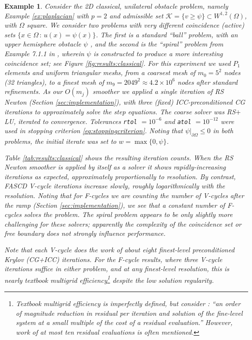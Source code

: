 \documentclass[letterpaper,final,12pt,reqno]{amsart}
\theoremstyle{cstyle}
\theoremstyle{cstyle*}
\theoremstyle{dstyle}
\newtheorem{example}[theorem]{Example}
\numberwithin{equation}{section}
\numberwithin{figure}{section}
\numberwithin{table}{section}
\numberwithin{theorem}{section}
\begin{document}
\begin{example} \label{ex:results:classical}
Consider the 2D classical, unilateral obstacle problem, namely Example \ref{ex:plaplacian} with $p=2$ and admissible set $\mathcal{K} = \{v \ge \psi\} \subset W^{1,2}(\Omega)$, with $\Omega$ square.  We consider two problems with very different coincidence (active) sets $\{x\in\Omega \,:\, u(x)=\psi(x)\}$.   The first is a standard ``ball'' problem, with an upper hemisphere obstacle $\psi$ \cite[Chapter 12]{Bueler2021}, and the second is the ``spiral'' problem from Example 7.1.1 in \cite{GraeserKornhuber2009}, wherein $\psi$ is constructed to produce a more interesting coincidence set; see Figure \ref{fig:results:classical}.  For this experiment we used $P_1$ elements and uniform triangular meshs, from a coarsest mesh of $m_0=5^2$ nodes (32 triangles), to a finest mesh of $m_9=2049^2 \approx 4.2 \times 10^{6}$ nodes after standard refinements.  As our $O(m_j)$ smoother we applied a single iteration of RS Newton (Section \ref{sec:implementation}), with three (fixed) ICC-preconditioned CG iterations to approximately solve the step equations.  The coarse solver was RS$+$LU, iterated to convergence.  Tolerances \texttt{rtol} $= 10^{-6}$ and \texttt{atol} $= 10^{-12}$ were used in stopping criterion \eqref{eq:stoppingcriterion}.  Noting that $\psi\big|_{\partial \Omega} \le 0$ in both problems, the initial iterate was set to $w=\max\{0,\psi\}$.

Table \ref{tab:results:classical} shows the resulting iteration counts.  When the RS Newton smoother is applied by itself as a solver it shows rapidly-increasing iterations as expected, approximately proportionally to resolution.  By contrast, FASCD V-cycle iterations increase slowly, roughly logarithmically with the resolution.  Noting that for F-cycles we are counting the number of V-cycles after the ramp (Section \ref{sec:implementation}), we see that a constant number of F-cycles solves the problem.  The spiral problem appears to be only slightly more challenging for these solvers; apparently the complexity of the coincidence set or free boundary does not strongly influence performance.

Note that each V-cycle does the work of about eight finest-level preconditioned Krylov (CG+ICC) iterations.  For the F-cycle results, where three V-cycle iterations suffice in either problem, and at any finest-level resolution, this is nearly textbook multigrid efficiency\footnote{Textbook multigrid efficiency is imperfectly defined, but consider \cite{BrownSmithAhmadia2013}: ``an order of magnitude reduction in residual per iteration and solution of the fine-level system at a small multiple of the cost of a residual evaluation.''  However, work of at most ten residual evaluations is often mentioned.} despite the low solution regularity.
\end{example}
\end{document}
